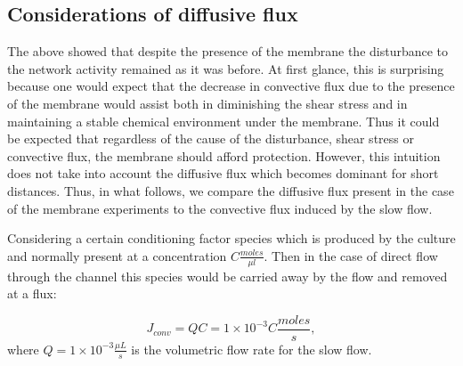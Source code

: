         \subsection{Considerations of diffusive flux}
        The above showed that despite the presence of the membrane the disturbance to the network activity remained as it was before. At first glance, this is surprising because one would expect that the decrease in convective flux due to the presence of the membrane would assist both in diminishing the shear stress and in maintaining a stable chemical environment under the membrane. Thus it could be expected that regardless of the cause of the disturbance, shear stress or convective flux, the membrane should afford protection. However, this intuition does not take into account the diffusive flux which becomes dominant for short distances. Thus, in what follows, we compare the diffusive flux present in the case of the membrane experiments to the convective flux induced by the slow flow.

        Considering a certain conditioning factor species which is produced by the culture and normally present at a concentration \(C \frac{moles}{\mu l}\). Then in the case of direct flow through the channel this species would be carried away by the flow and removed at a flux:

        \[J_{conv}=QC=1\times 10^{-3}C \frac{moles}{s},\] where \(Q=1\times 10^{-3}\frac{\mu L}{s}\) is the volumetric flow rate for the slow flow.

